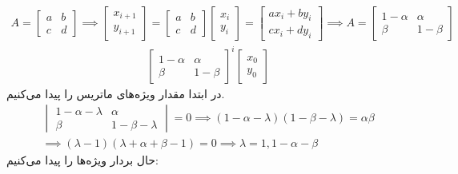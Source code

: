 \\
\begin{gather*}
    A = \begin{bmatrix}
        a & b \\
        c & d
    \end{bmatrix} \implies
    \begin{bmatrix}
        x_{i+1}\\
        y_{i+1}
    \end{bmatrix}
    =
    \begin{bmatrix}
        a & b \\
        c & d
    \end{bmatrix}
    \begin{bmatrix}
        x_i\\
        y_i
    \end{bmatrix}
    =
    \begin{bmatrix}
        ax_i + by_i\\
        cx_i + dy_i
    \end{bmatrix}
    \implies
    A = \begin{bmatrix}
        1-\alpha & \alpha \\
        \beta & 1-\beta
    \end{bmatrix}
\end{gather*}
\begin{gather*}
    \begin{bmatrix}
        1-\alpha & \alpha \\
        \beta & 1-\beta
    \end{bmatrix}^i
    \begin{bmatrix}
        x_0\\
        y_0
    \end{bmatrix}
\end{gather*}
در ابتدا مقدار ویژه‌های ماتریس را پیدا می‌کنیم.
\begin{gather*}
    \begin{vmatrix}
        1-\alpha-\lambda & \alpha \\
        \beta & 1-\beta-\lambda
    \end{vmatrix}
    = 0
    \implies
    (1-\alpha-\lambda)(1-\beta-\lambda) = \alpha \beta\\
    \implies (\lambda - 1) (\lambda + \alpha + \beta - 1) = 0
    \implies \lambda = 1, 1 - \alpha - \beta
\end{gather*}
حال بردار ویژه‌ها را پیدا می‌کنیم:
